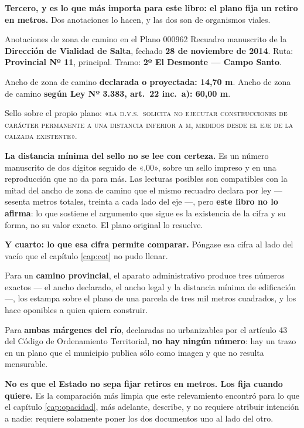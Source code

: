 \textbf{Tercero, y es lo que más importa para este libro: el plano fija un retiro en metros.}
Dos anotaciones lo hacen, y las dos son de organismos viales.

\begin{ficha}{Anotaciones de zona de camino en el Plano 000962}
Recuadro manuscrito de la \textbf{Dirección de Vialidad de Salta}, fechado \textbf{28 de
noviembre de 2014}. Ruta: \textbf{Provincial Nº 11}, principal. Tramo: \textbf{2º El
Desmonte --- Campo Santo}.

Ancho de zona de camino \textbf{declarada o proyectada: 14,70 m}. Ancho de zona de camino
\textbf{según Ley Nº 3.383, art.\ 22 inc.\ a): 60,00 m}.

Sello sobre el propio plano: «\textsc{la d.v.s.\ solicita no ejecutar construcciones de
carácter permanente a una distancia inferior a} \underline{\hspace{1.2cm}}
\textsc{m, medidos desde el eje de la calzada existente}».
\end{ficha}

\begin{cautela}
\textbf{La distancia mínima del sello no se lee con certeza.} Es un número manuscrito de dos
dígitos seguido de «,00», sobre un sello impreso y en una reproducción que no da para más.
Las lecturas posibles son compatibles con la mitad del ancho de zona de camino que el mismo
recuadro declara por ley --- sesenta metros totales, treinta a cada lado del eje ---, pero
\textbf{este libro no lo afirma}: lo que sostiene el argumento que sigue es la existencia de
la cifra y su forma, no su valor exacto. El plano original lo resuelve.
\end{cautela}

\begin{cautela}
\textbf{Y cuarto: lo que esa cifra permite comparar.} Póngase esa cifra al lado del vacío que el capítulo \ref{cap:cot} no pudo llenar.

Para un \textbf{camino provincial}, el aparato administrativo produce tres números exactos
--- el ancho declarado, el ancho legal y la distancia mínima de edificación ---, los
estampa sobre el plano de una parcela de tres mil metros cuadrados, y los hace oponibles a
quien quiera construir.

Para \textbf{ambas márgenes del río}, declaradas no urbanizables por el artículo 43 del
Código de Ordenamiento Territorial, \textbf{no hay ningún número}: hay un trazo en un plano que el municipio publica sólo como imagen y que no resulta mensurable.

\textbf{No es que el Estado no sepa fijar retiros en metros. Los fija cuando quiere.} Es la
comparación más limpia que este relevamiento encontró para lo que el capítulo
\ref{cap:opacidad}, más adelante, describe, y no requiere atribuir intención a nadie: requiere solamente
poner los dos documentos uno al lado del otro.
\end{cautela}

